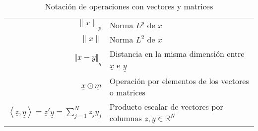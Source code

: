 \begin{table}[H]
\begin{center}
\begin{tabularx}{\textwidth}{|r|X|}
            $ {\lVert x \rVert}_{p} $                                                                                            & Norma $L^{p}$ de $x$                                                                        \\
            $ {\lVert x \rVert} $                                                                                                & Norma $L^{2}$ de $x$                                                                        \\
            $ {\Vert \underline{x} - \underline{y} \Vert}_{q} $                                                                  & Distancia en la misma dimensión entre $\underline{x}$ e $\underline{y}$                     \\
            $ \underline{x} \odot \underline{m} $                                                                                & Operación por elementos de los vectores o matrices                                          \\
            $ \left\langle \underline{z}, \underline{y} \right\rangle = \underline{z}' \underline{y} = \sum_{j=1}^{N}{z_j y_j} $ & Producto escalar de vectores por columnas $\underline{z}, \underline{y} \in \mathbb{R}^{N}$ \\
            \hline
        \end{tabularx}
        \caption{Notación de operaciones con vectores y matrices}
        \label{tab:notation-part-operations-v-m}
    \end{center}
\end{table}


